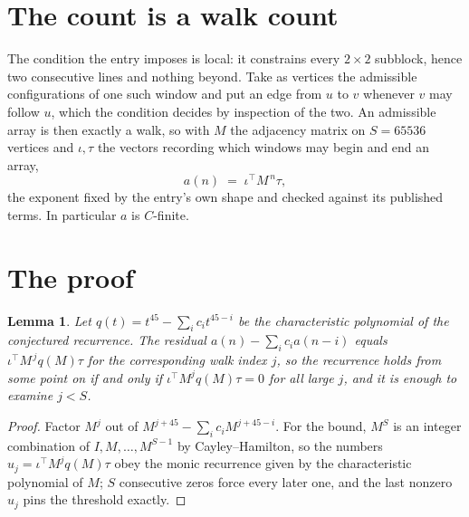\documentclass[11pt,a4paper]{article}
\theoremstyle{plain}
\newtheorem{lemma}[theorem]{Lemma}
\theoremstyle{definition}
\begin{document}
\section{The count is a walk count}

The condition the entry imposes is local: it constrains every $2\times2$ subblock, hence two consecutive lines and nothing beyond. Take as
vertices the admissible configurations of one such window and put an edge from $u$ to $v$
whenever $v$ may follow $u$, which the condition decides by inspection of the two. An
admissible array is then exactly a walk, so with $M$ the adjacency matrix on $S=65536$ vertices
and $\iota,\tau$ the vectors recording which windows may begin and end an array,
\[
a(n)\;=\;\iota^{\!\top}M^{\,n}\tau ,
\]
the exponent fixed by the entry's own shape and checked against its published terms. In
particular $a$ is $C$-finite.

\section{The proof}

\begin{lemma}\label{lem:crit}
Let $q(t)=t^{45}-\sum_i c_it^{45-i}$ be the characteristic polynomial of the
conjectured recurrence. The residual $a(n)-\sum_ic_ia(n-i)$ equals
$\iota^{\!\top}M^{\,j}q(M)\tau$ for the corresponding walk index $j$, so the recurrence
holds from some point on if and only if $\iota^{\!\top}M^{j}q(M)\tau=0$ for all large $j$,
and it is enough to examine $j<S$.
\end{lemma}

\begin{proof}
Factor $M^{j}$ out of $M^{j+45}-\sum_ic_iM^{j+45-i}$. For the bound, $M^{S}$
is an integer combination of $I,M,\dots,M^{S-1}$ by Cayley--Hamilton, so the numbers
$u_j=\iota^{\!\top}M^{j}q(M)\tau$ obey the monic recurrence given by the characteristic
polynomial of $M$; $S$ consecutive zeros force every later one, and the last nonzero $u_j$
pins the threshold exactly.
\end{proof}
\end{document}
